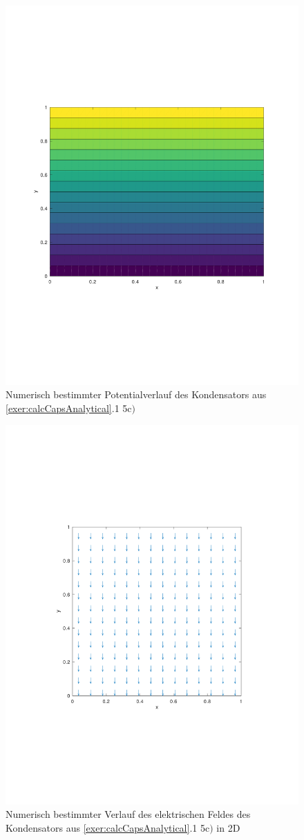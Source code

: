 \documentclass[Protokollheft.tex]{subfiles}
\begin{document}
\begin{figure}[h!]
	\centering
	\includegraphics[trim = 20mm 70mm 20mm 70mm, clip,width=0.7\linewidth]{potential_C.pdf}
	\caption{Numerisch bestimmter Potentialverlauf des Kondensators aus \ref{exer:calcCapsAnalytical}.1 5c$)$}
\end{figure}

\begin{figure}[h!]
	\centering
	\includegraphics[trim = 20mm 70mm 20mm 70mm, clip,width=0.7\linewidth]{E_2D_C.pdf}
	\caption{Numerisch bestimmter Verlauf des elektrischen Feldes des Kondensators aus \ref{exer:calcCapsAnalytical}.1 5c$)$ in 2D}
\end{figure}
\end{document}
